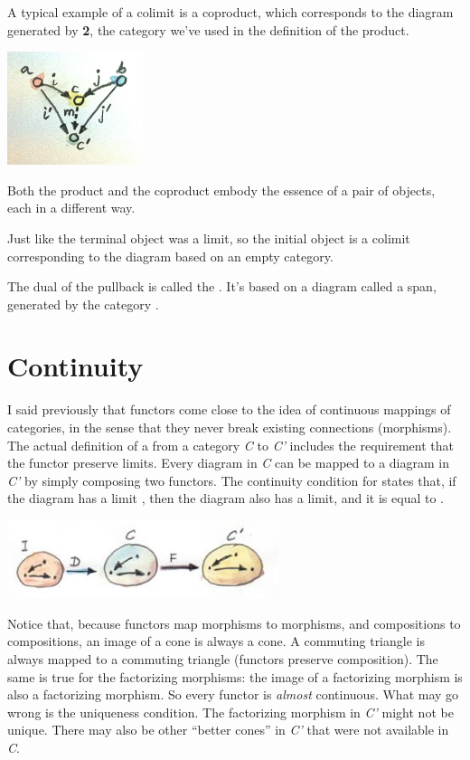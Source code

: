 A typical example of a colimit is a coproduct, which corresponds to the
diagram generated by \textbf{2}, the category we've used in the
definition of the product.

\includegraphics[width=1.56250in]{images/coproductranking.jpg}

Both the product and the coproduct embody the essence of a pair of
objects, each in a different way.

Just like the terminal object was a limit, so the initial object is a
colimit corresponding to the diagram based on an empty category.

The dual of the pullback is called the . It's based on a
diagram called a span, generated by the category
.

\section{Continuity}\label{continuity}

I said previously that functors come close to the idea of continuous
mappings of categories, in the sense that they never break existing
connections (morphisms). The actual definition of a   from a category \emph{C} to \emph{C'} includes the
requirement that the functor preserve limits. Every diagram 
in \emph{C} can be mapped to a diagram  in \emph{C'} by
simply composing two functors. The continuity condition for 
states that, if the diagram  has a limit , then
the diagram  also has a limit, and it is equal to
.

\includegraphics[width=3.12500in]{images/continuity.jpg}

Notice that, because functors map morphisms to morphisms, and
compositions to compositions, an image of a cone is always a cone. A
commuting triangle is always mapped to a commuting triangle (functors
preserve composition). The same is true for the factorizing morphisms:
the image of a factorizing morphism is also a factorizing morphism. So
every functor is \emph{almost} continuous. What may go wrong is the
uniqueness condition. The factorizing morphism in \emph{C'} might not be
unique. There may also be other ``better cones'' in \emph{C'} that were
not available in \emph{C}.

